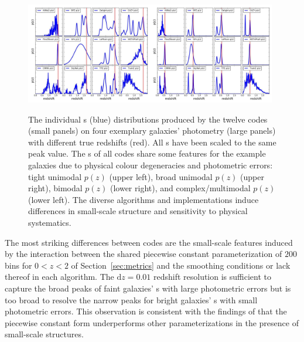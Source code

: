 \begin{figure}
\includegraphics[width=0.49\textwidth]{fig/pz_12codes_713178_noseaborn_crop.jpg}\includegraphics[width=0.49\textwidth]{fig/pz_12codes_982747_noseaborn_crop.jpg}
\caption{The individual \pzpdf s (blue) distributions produced by the twelve codes (small panels) on four exemplary galaxies' photometry (large panels) with different true redshifts (red).
All \pzpdf s have been scaled to the same peak value.
The \pzpdf s of all codes share some features for the example galaxies due to physical colour degeneracies and photometric errors: tight unimodal $p(z)$ (upper left), broad unimodal $p(z)$ (upper right), bimodal $p(z)$ (lower right), and complex/multimodal $p(z)$ (lower left).
The diverse algorithms and implementations induce differences in small-scale structure and sensitivity to physical systematics.}
\label{fig:pz_examples}
\end{figure}

The most striking differences between codes are the small-scale features induced by the interaction between the shared piecewise constant parameterization of $200$ bins for $0 < z < 2$ of Section~\ref{sec:metrics} and the smoothing conditions or lack thereof in each algorithm.
The $\mathrm{d}z = 0.01$ redshift resolution is sufficient to capture the broad peaks of faint galaxies' \pzpdf s with large photometric errors but is too broad to resolve the narrow peaks for bright galaxies' \pzpdf s with small photometric errors.
This observation is consistent with the findings of \citet[]{Malz:2018} that the piecewise constant form underperforms other parameterizations in the presence of small-scale structures.

